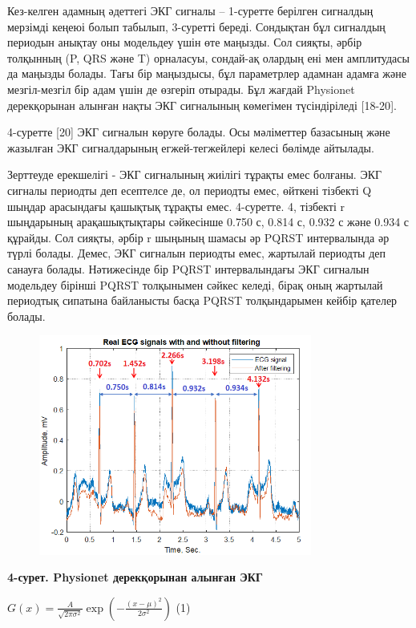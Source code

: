 {Кез-келген адамның әдеттегі ЭКГ сигналы -- 1-суретте берілген сигналдың
мерзімді кеңеюі болып табылып, 3-суретті береді. Сондықтан бұл сигналдың
периодын анықтау оны модельдеу үшін өте маңызды. Сол сияқты, әрбір
толқынның (P, QRS және T) орналасуы, сондай-ақ олардың ені мен
амплитудасы да маңызды болады. Тағы бір маңыздысы, бұл параметрлер
адамнан адамға және мезгіл-мезгіл бір адам үшін де өзгеріп отырады. Бұл
жағдай Physionet дерекқорынан алынған нақты ЭКГ сигналының көмегімен
түсіндіріледі {[}18-20{]}.

4-суретте {[}20{]} ЭКГ сигналын көруге болады. Осы мәліметтер базасының
және жазылған ЭКГ сигналдарының егжей-тегжейлері келесі бөлімде
айтылады.

Зерттеуде ерекшелігі - ЭКГ сигналының жиілігі тұрақты емес болғаны. ЭКГ
сигналы периодты деп есептелсе де, ол периодты емес, өйткені тізбекті Q
шыңдар арасындағы қашықтық тұрақты емес. 4-суретте. 4, тізбекті r
шыңдарының арақашықтықтары сәйкесінше 0.750 с, 0.814 с, 0.932 с және
0.934 с құрайды. Сол сияқты, әрбір r шыңының шамасы әр PQRST
интервалында әр түрлі болады. Демес, ЭКГ сигналын периодты емес,
жартылай периодты деп санауға болады. Нәтижесінде бір PQRST
интервалындағы ЭКГ сигналын модельдеу бірінші PQRST толқынымен сәйкес
келеді, бірақ оның жартылай периодтық сипатына байланысты басқа PQRST
толқындарымен кейбір қателер болады.

\begin{figure}[H]
	\centering
	\includegraphics[width=0.8\textwidth]{media/ict/image43}
	\caption*{}
\end{figure}


{\bfseries 4-сурет. Physionet дерекқорынан алынған ЭКГ}

\(G(x) = \frac{A}{\sqrt{2\pi\sigma^{2}}}\exp\left( - \frac{(x - \mu)^{2}}{2\sigma^{2}} \right)\)
(1)

}
